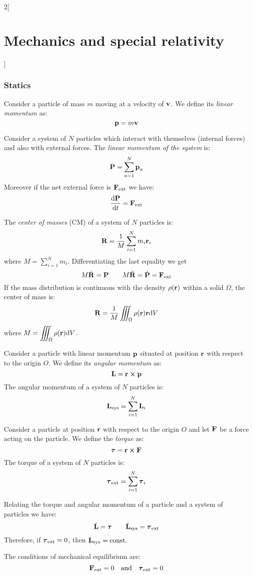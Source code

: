 \documentclass[../../../main.tex]{subfiles}
\begin{document}
\begin{multicols}{2}[\section{Mechanics and special relativity}]
  \subsubsection{Statics}
  \begin{definition}
    Consider a particle of mass $m$ moving at a velocity of $\boldsymbol{\mathrm{v}}$. We define its \textit{linear momentum} as:
    $$\boldsymbol{\mathrm{p}}=m\boldsymbol{\mathrm{v}}$$
  \end{definition}
  \begin{prop}
    Consider a system of $N$ particles which interact with themselves (internal forces) and also with external forces. The \textit{linear momentum of the system} is: $$\boldsymbol{\mathrm{P}}=\sum_{a=1}^N\boldsymbol{\mathrm{p}}_a$$ Moreover if the net external force is $\boldsymbol{\mathrm{F}}_\text{ext}$ we have:
    $$\dv{\boldsymbol{\mathrm{P}}}{t}=\boldsymbol{\mathrm{F}}_\text{ext}$$
  \end{prop}
  \begin{prop}
    The \textit{center of masses} (CM) of a system of $N$ particles is: $$\boldsymbol{\mathrm{R}}=\frac{1}{M}\sum_{i=1}^Nm_i\boldsymbol{\mathrm{r}}_i$$ where $\displaystyle M=\sum_{i=1}^Nm_i$. Differentiating the last equality we get
    $$M\dot{\boldsymbol{\mathrm{R}}}=\boldsymbol{\mathrm{P}}\qquad M\ddot{\boldsymbol{\mathrm{R}}}=\dot{\boldsymbol{\mathrm{P}}}=\boldsymbol{\mathrm{F}}_\text{ext}$$
    If the mass distribution is continuous with the density $\rho(\boldsymbol{\mathrm{r}})$ within a solid $\Omega$, the center of mass is: $$\boldsymbol{\mathrm{R}}=\frac{1}{M}\iiint_\Omega\rho(\boldsymbol{\mathrm{r}})\boldsymbol{\mathrm{r}}\dd V$$ where $\displaystyle M=\iiint_\Omega\rho(\boldsymbol{\mathrm{r}})\dd V$.
  \end{prop}
  \begin{prop}
    Consider a particle with linear momentum $\boldsymbol{\mathrm{p}}$ situated at position $\boldsymbol{\mathrm{r}}$ with respect to the origin $O$. We define its \textit{angular momentum} as: $$\vf{L}=\vf{r}\crossprod\vf{p}$$ The angular momentum of a system of $N$ particles is: $$\boldsymbol{\mathrm{L}}_\text{sys}=\sum_{i=1}^N\boldsymbol{\mathrm{L}}_i$$
  \end{prop}
  \begin{prop}[Torque]
    Consider a particle at position $\boldsymbol{\mathrm{r}}$ with respect to the origin $O$ and let $\boldsymbol{\mathrm{F}}$ be a force acting on the particle. We define the \textit{torque} as: $$\vf{\tau}=\vf{r}\crossprod\vf{F}$$ The torque of a system of $N$ particles is: $$\boldsymbol{\mathrm{\tau}}_\text{ext}=\sum_{i=1}^N\boldsymbol{\mathrm{\tau}}_i$$
  \end{prop}
  \begin{prop}
    Relating the torque and angular momentum of a particle and a system of particles we have:
    $$\dot{\boldsymbol{\mathrm{L}}}=\boldsymbol{\mathrm{\tau}}\qquad\dot{\boldsymbol{\mathrm{L}}}_\text{sys}=\boldsymbol{\mathrm{\tau}}_\text{ext}$$ Therefore, if $\boldsymbol{\mathrm{\tau}}_\text{ext}=0$, then $\boldsymbol{\mathrm{L}}_\text{sys}=\text{const}.$
  \end{prop}
  \begin{definition}
    The conditions of mechanical equilibrium are: $$\boldsymbol{\mathrm{F}}_\text{ext}=0\quad\text{and}\quad\boldsymbol{\mathrm{\tau}}_\text{ext}=0$$
  \end{definition}

\end{multicols}
\end{document}

